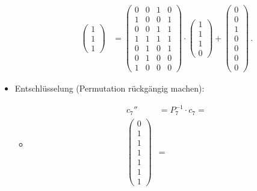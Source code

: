 \begin{itemize}
\begin{itemize}
\begin{align*}
\begin{pmatrix}
            1\\
            1\\
            1
        \end{pmatrix}
        &=
        \begin{pmatrix} %
            0 & 0 & 1 & 0\\
            1 & 0 & 0 & 1\\
            0 & 0 & 1 & 1\\
            1 & 1 & 1 & 1\\
            0 & 1 & 0 & 1\\
            0 & 1 & 0 & 0\\
            1 & 0 & 0 & 0
        \end{pmatrix}
        \cdot
        \begin{pmatrix} %
            1\\
            1\\
            1\\
            0 
        \end{pmatrix}
        +
        \begin{pmatrix} %
            0\\
            0\\
            1\\
            0\\
            0\\
            0\\
            0
        \end{pmatrix} 
        \,.
        \end{align*}
    \end{itemize}
    \item Entschlüsselung (Permutation rückgängig machen):
    \begin{itemize}
        \item[]
        \begin{align*}
            c_{7}''&=P_7^{-1}\cdot c_7=\\
            \begin{pmatrix} %
                0\\
                1\\
                1\\
                1\\
                1\\
                1\\
                1
            \end{pmatrix}
            &=

\end{align*}
\end{itemize}
\end{itemize}
